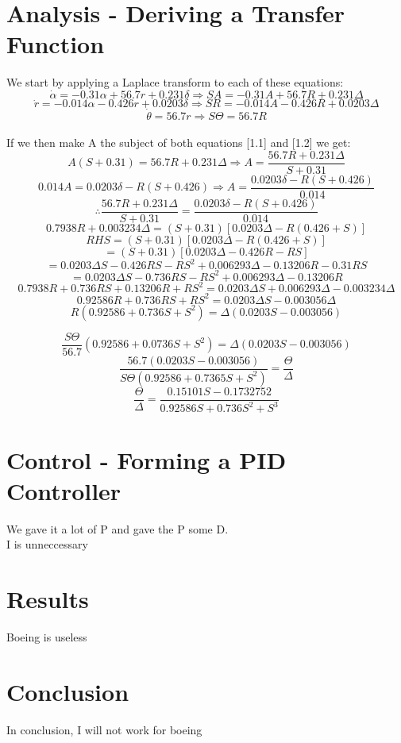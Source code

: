 \documentclass{article}
\begin{document}
\section{Analysis - Deriving a Transfer Function}
We start by applying a Laplace transform to each of these equations:
\[\dot{\alpha}=-0.31\alpha + 56.7r + 0.231\delta\Rightarrow SA =-0.31A  + 56.7R + 0.231 \Delta\]
\[\dot{r}=-0.014\alpha - 0.426r +0.0203\delta\Rightarrow SR=-0.014A  - 0.426R +0.0203 \Delta \]
\[\dot{\theta} = 56.7r\Rightarrow S \Theta = 56.7R\]\\
If we then make A the subject of both equations [1.1] and [1.2] we get:  
\[A(S + 0.31) =56.7R + 0.231 \Delta \Rightarrow A = \frac{56.7R +0.231 \Delta}{S + 0.31}\]
\[0.014A = 0.0203\delta - R(S+0.426) \Rightarrow A= \frac{0.0203\delta - R(S+0.426)}{0.014}\]
\[\therefore \frac{56.7R +0.231 \Delta}{S + 0.31} = \frac{0.0203\delta - R(S+0.426)}{0.014}\]
\[0.7938R +0.003234\Delta=(S+0.31)[0.0203\Delta - R(0.426+S)]\]
\[RHS = (S + 0.31)[0.0203\Delta - R(0.426 +S)]\]
\[=(S+0.31)[0.0203\Delta - 0.426R - RS]\]
\[=0.0203\Delta S -0.426 RS - RS^2 +0.006293\Delta - 0.13206R -0.31RS\]
\[=0.0203 \Delta S -0.736RS - RS^2 + 0.006293\Delta - 0.13206R\]
\[0.7938R + 0.736 RS + 0.13206R +RS^2 = 0.0203\Delta S +0.006293\Delta -  0.003234\Delta\]
\[0.92586R + 0.736 RS + RS^2 = 0.0203 \Delta S - 0.003056\Delta\]
\[R(0.92586 +0.736S + S^2) = \Delta (0.0203S - 0.003056)\]

\[\frac{S\Theta}{56.7}(0.92586 + 0.0736S +S^2)=\Delta(0.0203S - 0.003056)\]
\[\frac{56.7(0.0203S - 0.003056)}{S\Theta(0.92586 + 0.7365S+S^2)} = \frac{\Theta}{\Delta}\]
\[\frac{\Theta}{\Delta} = \frac{0.15101S - 0.1732752}{0.92586S + 0.736S^2 + S^3}\]

\newpage
\section{Control - Forming a PID Controller}
We gave it a lot of P and gave the P some D.\\
I is unneccessary
\newpage
\section{Results}
Boeing is useless
\newpage
\section{Conclusion}
In conclusion, I will not work for boeing
\end{document}
